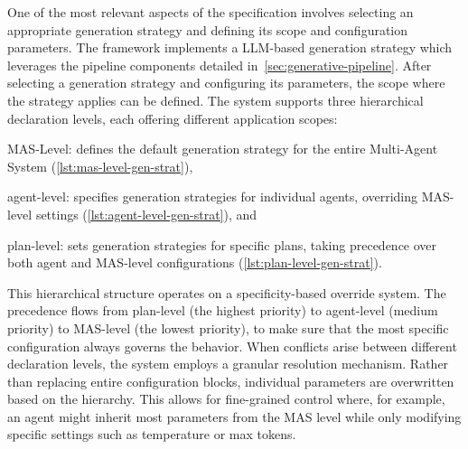 \documentclass[12pt,a4paper,openright,twoside]{book}
\begin{document}
One of the most relevant aspects of the specification involves selecting an appropriate generation strategy and defining its scope and configuration parameters. 
%
The framework implements a \ac{LLM}-based generation strategy which leverages the pipeline components detailed in~\cref{sec:generative-pipeline}.
%
After selecting a generation strategy and configuring its parameters, the scope where the strategy applies can be defined. The system supports three hierarchical declaration levels, each offering different application scopes:
%
\begin{inlinelist}
    \item \ac{MAS}-Level: defines the default generation strategy for the entire Multi-Agent System (\cref{lst:mas-level-gen-strat}),
    \item agent-level: specifies generation strategies for individual agents, overriding MAS-level settings (\cref{lst:agent-level-gen-strat}), and
    \item plan-level: sets generation strategies for specific plans, taking precedence over both agent and MAS-level configurations (\cref{lst:plan-level-gen-strat}).
\end{inlinelist}
%
This hierarchical structure operates on a specificity-based override system. 
%
The precedence flows from plan-level (the highest priority) to agent-level (medium priority) to MAS-level (the lowest priority), to make sure that the most specific configuration always governs the behavior.
%
When conflicts arise between different declaration levels, the system employs a granular resolution mechanism.
%
Rather than replacing entire configuration blocks, individual parameters are overwritten based on the hierarchy.
%
This allows for fine-grained control where, for example, an agent might inherit most parameters from the MAS level while only modifying specific settings such as temperature or max tokens.






\end{document}
